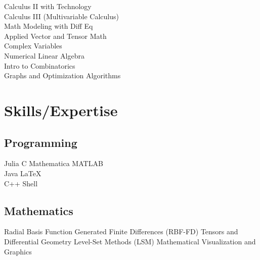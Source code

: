 \documentclass[letterpaper]{deedy-resume} %
\begin{document}
\begin{minipage}[t]{0.33\textwidth}
\sectionspace %

Calculus II with Technology \\
Calculus III (Multivariable Calculus) \\
Math Modeling with Diff Eq \\
Applied Vector and Tensor Math \\
Complex Variables \\
Numerical Linear Algebra \\
Intro to Combinatorics \\
Graphs and Optimization Algorithms


\section{Skills/Expertise}

\subsection{Programming}
Julia \textbullet{} C \textbullet{} Mathematica \textbullet{} MATLAB \\ 
\textbullet{} Java \textbullet{} \LaTeX \\
C++ \textbullet{} Shell

\sectionspace

\subsection{Mathematics}
Radial Basis Function Generated Finite Differences (RBF-FD) \textbullet{} Tensors and Differential Geometry \textbullet{} Level-Set Methods (LSM) \textbullet{} Mathematical Visualization and Graphics



\end{minipage} %
\hfill
%
%
\end{document}
